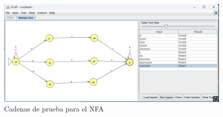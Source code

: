 \documentclass[11pt]{report}
\begin{document}
\begin{figure}[H]
  \centering
  \includegraphics[scale=0.6]{img/NFA_06_test.png}
  \caption{Cadenas de prueba para el NFA}
\end{figure}
\end{document}
